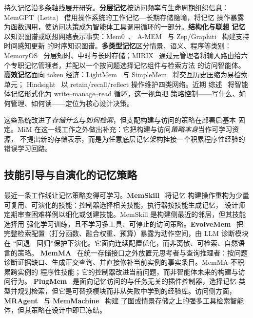 \documentclass[UTF8,11pt]{ctexart}
\begin{document}
持久记忆沿多条轴线展开研究。\textbf{分层记忆}按访问频率与生命周期组织信息：
MemGPT~(Letta)~\cite{packer2023memgpt} 借用操作系统的工作记忆—长期存储隐喻，将记忆
操作暴露为函数调用，使访问决策成为智能体工具调用循环的一部分。\textbf{结构化与联想
记忆}以知识图谱或联想网络表示事实：Mem0~\cite{chattopadhyay2025mem0}、
A-MEM~\cite{zhang2025amem} 与 Zep/Graphiti~\cite{zhu2025graphiti} 构建支持时间感知更新
的时序知识图谱。\textbf{多类型记忆}区分情景、语义、程序等类别：
MemoryOS~\cite{chen2025memoryos} 分层短时、中时与长时存储；MIRIX~\cite{vlasic2025mirix}
通过元管理者将输入路由给六个专职记忆管理者，并配以一个按问题选择记忆组件与检索方法
的访问智能体。\textbf{高效记忆}面向 token 经济：LightMem~\cite{luo2025lightmem} 与
SimpleMem~\cite{liu2026simplemem} 将交互历史压缩为易检索单元；
Hindsight~\cite{van2025hindsight} 以 retain/recall/reflect 操作维护四类网络。近期
综述~\cite{du2026survey} 将智能体记忆形式化为 write--manage--read 循环，这一视角把
策略控制——写什么、如何管理、如何读——定位为核心设计决策。

这些系统改进了\emph{存储什么}与\emph{如何检索}，但支配构建与访问的策略在部署后基本
固定。MiM 在这一线工作之外做出补充：它把构建与访问\emph{策略本身}当作可学习资源，
不提出新的存储表示，而是为任意底层记忆架构挂接一个积累程序性经验的错误学习回路。

\subsection{技能引导与自演化的记忆策略}
\label{sec:rw-self}

最近一条工作线让记忆策略变得可学习。\textbf{MemSkill}~\cite{zhang2026memskill} 将记忆
构建操作重构为少量可复用、可演化的技能：控制器选择相关技能，执行器按技能生成记忆，
设计师定期审查困难样例以细化或创建技能。MemSkill 是构建侧最近的邻居，但其技能选择用
强化学习训练，且不学习多工具、可停止的访问策略。\textbf{EvolveMem}~\cite{liu2026evolvemem}
把完整检索配置（打分函数、融合权重、预算）暴露为动作空间，由 LLM 诊断模块在
“回退—回归”保护下演化。它面向连续配置优化，而非离散、可检索、自然语言的策略。
\textbf{MemMA}~\cite{memma2026} 在统一存储接口之外放置元思考者与查询推理者：按问题
诊断证据缺口、生成正交查询、并直接修补当前实例的事实条目。MemMA 不积累跨实例的
程序性技能；它的控制器改进当前问题，而非智能体未来的构建与访问行为。
\textbf{PlugMem}~\cite{plugmem2026} 是面向记忆访问的与任务无关的插件控制器，选择记忆
类型并规划检索，但它是可替换模块而非从失败中学到的经验库。访问侧方面，
\textbf{MRAgent}~\cite{ji2026mragent} 与 \textbf{MemMachine}~\cite{memmachine2026} 构建
了图或情景存储之上的强多工具检索智能体，但其策略在设计中即已冻结。
\end{document}
